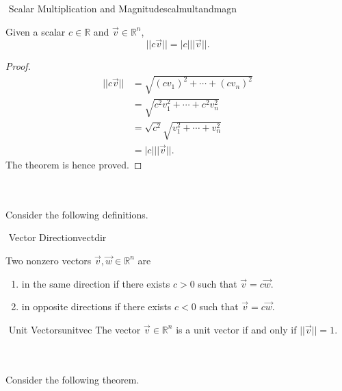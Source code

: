     \begin{theorem}{\Stop\,\,Scalar Multiplication and Magnitude}{scalmultandmagn}

        Given a scalar \(c\in\mathbb{R}\) and \(\vec{v}\in\mathbb{R}^n\), 
        \begin{equation*}
            ||c\vec{v}||=|c|||\vec{v}||.
        \end{equation*}
        \begin{proof}
        \begin{align*}
            ||c\vec{v}||&=\sqrt{(cv_1)^2+\cdots+(cv_n)^2} \\
            &=\sqrt{c^2v_1^2+\cdots+c^2v_n^2} \\
            &=\sqrt{c^2}\sqrt{v_1^2+\cdots+v_n^2} \\
            &=|c|||\vec{v}||.
        \end{align*}    
        The theorem is hence proved.
        \end{proof}
            
    \end{theorem}
    \pagebreak
    \vphantom
    \\
    \\
    Consider the following definitions.
    \begin{definition}{\Stop\,\,Vector Direction}{vectdir}

        Two nonzero vectors \(\vec{v},\vec{w}\in\mathbb{R}^n\) are
        \begin{enumerate}
            \item in the same direction if there exists \(c>0\) such that \(\vec{v}=c\vec{w}\).
            \item in opposite directions if there exists \(c<0\) such that \(\vec{v}=c\vec{w}\).
        \end{enumerate}
        
    \end{definition}
    \begin{definition}{\Stop\,\,Unit Vectors}{unitvec}
        The vector \(\vec{v}\in\mathbb{R}^n\) is a unit vector if and only if \(||\vec{v}||=1\).
    \end{definition}
    \vphantom
    \\
    \\
    Consider the following theorem.
